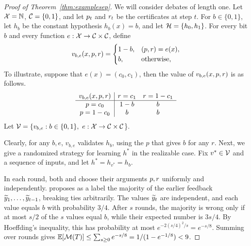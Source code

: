 \documentclass[11pt,letterpaper]{article}
\theoremstyle{definition}
\theoremstyle{plain}
\begin{document}
\begin{proof}[Proof of Theorem~\ref{thm:examplesep}]
We will consider debates of length one. Let ${\mathcal X}=\mathbb{N}$, ${{\mathcal C}}=\{0,1\}$, and let ${p}_t$ and ${r}_t$ be the certificates at step $t$. For $b\in\{0,1\}$, let $h_b$ be the constant hypothesis $h_b(x)=b$, and let ${{\mathcal H}}=\{h_0,h_1\}$. For every bit $b$ and every function $e:{\mathcal X}\to {{\mathcal C}}\times{{\mathcal C}}$, define
\[
v_{b,e}(x,{p},{r})=
\begin{cases}
1-b, & ({p},{r})=e(x),\\
b, & \text{otherwise},
\end{cases}
\]
To illustrate, suppose that $e(x) = (c_0,c_1)$, then the value of $v_{b,e}(x,{p},{r})$ is as follows.
\[
\begin{array}{c|cc}
v_{b,e}(x,{p},{r}) & {r}=c_1 & {r}=1-c_1\\
\hline
{p}=c_0 & 1-b & b\\
{p}=1-c_0 & b & b
\end{array}
\]
Let ${\mathcal V}=\{v_{b,e}:b\in\{0,1\},\ e:{\mathcal X}\to {{\mathcal C}}\times{{\mathcal C}}$\}. 

Clearly, for any $b,e$, $v_{b,e}$ validates $h_b$, using the $p$ that gives $b$ for any $r$. %
Next, we give a randomized strategy for learning $h^*$ in the realizable case. Fix $v^*\in{\mathcal V}$ and a sequence of inputs, and let $h^*=h_{v^*}=h_b$. 


In each round, both \dt and \df choose their arguments ${p},{r}$ uniformly and independently. \dt proposes as a label the majority of the earlier feedback ${\widetilde{y}}_1,\ldots,{\widetilde{y}}_{t-1}$, breaking ties arbitrarily. 
The values ${\widetilde{y}}_t$ are independent, and each value equals $b$ with probability $3/4$. After $s$ rounds, the majority is wrong only if at most $s/2$ of the $s$ values equal $b$, while their expected number is $3s/4$. By Hoeffding's inequality, this has probability at most $e^{-2(s/4)^2/s}=e^{-s/8}$. Summing over rounds gives $\mathbb{E}[{\mathcal M}(T)]\le\sum_{s\ge0}e^{-s/8}=1/(1-e^{-1/8})<9$. 


\end{proof}
\end{document}
